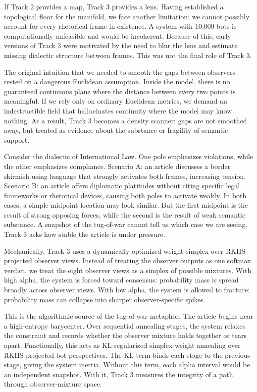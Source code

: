 If Track 2 provides a map, Track 3 provides a lens. Having established a topological floor for the manifold, we face another limitation: we cannot possibly account for every rhetorical frame in existence. A system with 10,000 bots is computationally unfeasible and would be incoherent. Because of this, early versions of Track 3 were motivated by the need to blur the lens and estimate missing dialectic structure between frames. This was not the final role of Track 3.

The original intuition that we needed to smooth the gaps between observers rested on a dangerous Euclidean assumption. Inside the model, there is no guaranteed continuous plane where the distance between every two points is meaningful. If we rely only on ordinary Euclidean metrics, we demand an indestructible field that hallucinates continuity where the model may know nothing. As a result, Track 3 becomes a density scanner: gaps are not smoothed away, but treated as evidence about the substance or fragility of semantic support.

Consider the dialectic of International Law. One pole emphasizes violations, while the other emphasizes compliance. Scenario A: an article discusses a border skirmish using language that strongly activates both frames, increasing tension. Scenario B: an article offers diplomatic platitudes without citing specific legal frameworks or rhetorical devices, causing both poles to activate weakly. In both cases, a simple midpoint location may look similar. But the first midpoint is the result of strong opposing forces, while the second is the result of weak semantic substance. A snapshot of the tug-of-war cannot tell us which case we are seeing. Track 3 asks how stable the article is under pressure.

Mechanically, Track 3 uses a dynamically optimized weight simplex over RKHS-projected observer views. Instead of treating the observer outputs as one softmax verdict, we treat the eight observer views as a simplex of possible mixtures. With high alpha, the system is forced toward consensus: probability mass is spread broadly across observer views. With low alpha, the system is allowed to fracture: probability mass can collapse into sharper observer-specific spikes.

This is the algorithmic source of the tug-of-war metaphor. The article begins near a high-entropy barycenter. Over sequential annealing stages, the system relaxes the constraint and records whether the observer mixture holds together or tears apart. Functionally, this acts as KL-regularized simplex-weight annealing over RKHS-projected bot perspectives. The KL term binds each stage to the previous stage, giving the system inertia. Without this term, each alpha interval would be an independent snapshot. With it, Track 3 measures the integrity of a path through observer-mixture space.

